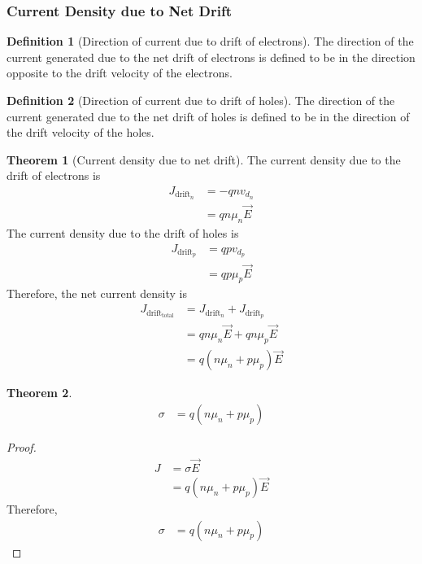 \documentclass[titlepage, fleqn, a4paper, 12pt, twoside]{article}
\theoremstyle{definition}
\newtheorem{definition}{Definition}
\theoremstyle{theorem}
\newtheorem{theorem}{Theorem}
\begin{document}
\subsubsection{Current Density due to Net Drift}

\begin{definition}[Direction of current due to drift of electrons]
	The direction of the current generated due to the net drift of electrons is defined to be in the direction opposite to the drift velocity of the electrons.
\end{definition}

\begin{definition}[Direction of current due to drift of holes]
	The direction of the current generated due to the net drift of holes is defined to be in the direction of the drift velocity of the holes.
\end{definition}

\begin{theorem}[Current density due to net drift]
	The current density due to the drift of electrons is
	\begin{align*}
		J_{\text{drift}_n} &= -q n v_{d_n}\\
		&= q n \mu_n \overrightarrow{E}
	\end{align*}
	The current density due to the drift of holes is
	\begin{align*}
		J_{\text{drift}_p} &= q p v_{d_p}\\
		&= q p \mu_p \overrightarrow{E}
	\end{align*}
	Therefore, the net current density is
	\begin{align*}
		J_{\text{drift}_{\text{total}}} &= J_{\text{drift}_n} + J_{\text{drift}_p}\\
		&= q n \mu_n \overrightarrow{E} + q n \mu_p \overrightarrow{E}\\
		&= q (n \mu_n + p \mu_p) \overrightarrow{E}
	\end{align*}
\end{theorem}

\begin{theorem}
	\begin{align*}
		\sigma &= q (n \mu_n + p \mu_p)
	\end{align*}
\end{theorem}

\begin{proof}
	\begin{align*}
		J &= \sigma \overrightarrow{E}\\
		&= q (n \mu_n + p \mu_p) \overrightarrow{E}
	\end{align*}
	Therefore,
	\begin{align*}
		\sigma &= q (n \mu_n + p \mu_p)
	\end{align*}
\end{proof}
\end{document}

